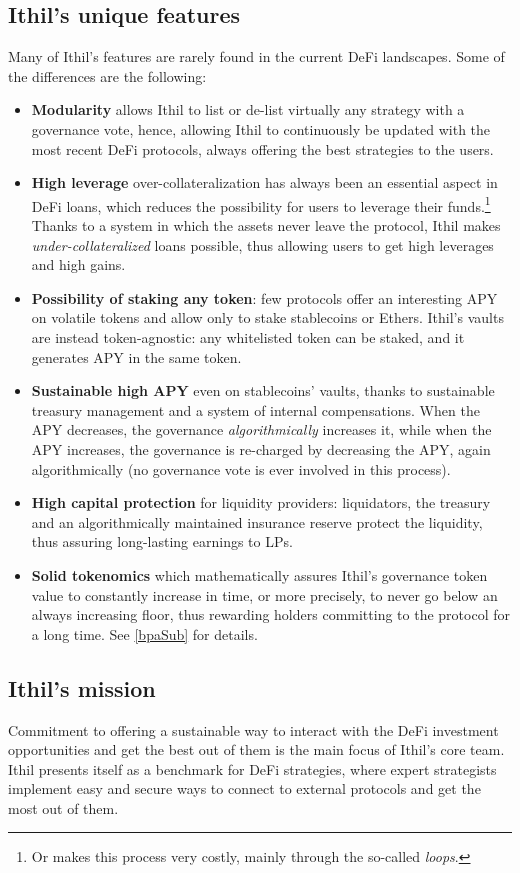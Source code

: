 \documentclass[a4paper,10 pt]{article}
\theoremstyle{definition}
\begin{document}
\subsection{Ithil's unique features}
Many of Ithil's features are rarely found in the current DeFi landscapes. Some of the differences are the following:
\begin{itemize}
\item {\bf Modularity} allows Ithil to list or de-list virtually any strategy with a governance vote, hence, allowing Ithil to continuously be updated with the most recent DeFi protocols, always offering the best strategies to the users.
\item {\bf High leverage} over-collateralization has always been an essential aspect in DeFi loans, which reduces the possibility for users to leverage their funds.\footnote{Or makes this process very costly, mainly through the so-called {\it loops}.} Thanks to a system in which the assets never leave the protocol, Ithil makes {\it under-collateralized} loans possible, thus allowing users to get high leverages and high gains.
\item {\bf Possibility of staking any token}: few protocols offer an interesting APY on volatile tokens and allow only to stake stablecoins or Ethers. Ithil's vaults are instead token-agnostic: any whitelisted token can be staked, and it generates APY in the same token.
\item {\bf Sustainable high APY} even on stablecoins' vaults, thanks to sustainable treasury management and a system of internal compensations. When the APY decreases, the governance {\it algorithmically} increases it, while when the APY increases, the governance is re-charged by decreasing the APY, again algorithmically (no governance vote is ever involved in this process).
\item {\bf High capital protection} for liquidity providers: liquidators, the treasury and an algorithmically maintained insurance reserve protect the liquidity, thus assuring long-lasting earnings to LPs.
\item {\bf Solid tokenomics} which mathematically assures Ithil's governance token value to constantly increase in time, or more precisely, to never go below an always increasing floor, thus rewarding holders committing to the protocol for a long time. See \ref{bpaSub} for details. 
\end{itemize}

\subsection{Ithil's mission}
Commitment to offering a sustainable way to interact with the DeFi investment opportunities and get the best out of them is the main focus of Ithil's core team. Ithil presents itself as a benchmark for DeFi strategies, where expert strategists implement easy and secure ways to connect to external protocols and get the most out of them.
\end{document}
